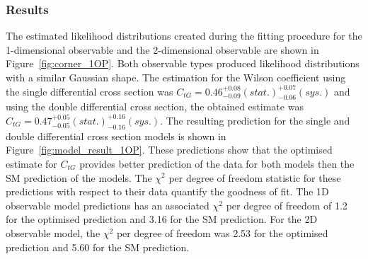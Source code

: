 \documentclass[a4paper,11pt]{article}
\begin{document}
\subsubsection{Results}
The estimated likelihood distributions created during the fitting procedure for the 1-dimensional observable and the 2-dimensional observable are shown in Figure~\ref{fig:corner_1OP}.
Both observable types produced likelihood distributions with a similar Gaussian shape.
The estimation for the Wilson coefficient using the single differential cross section was $C_{tG}=0.46^{+0.08}_{-0.09}(stat.)^{+0.07}_{-0.06}(sys.)$ and using the double differential cross section, the obtained estimate was $C_{tG}=0.47^{+0.05}_{-0.05}(stat.)^{+0.16}_{-0.16}(sys.)$.
The resulting prediction for the single and double differential cross section models is shown in Figure~\ref{fig:model_result_1OP}.
These predictions show that the optimised estimate for $C_{tG}$ provides better prediction of the data for both models then the SM prediction of the models.
The $\chi^{2}$ per degree of freedom statistic for these predictions with respect to their data quantify the goodness of fit.
The 1D observable model predictions has an associated $\chi^{2}$ per degree of freedom of 1.2 for the optimised prediction and 3.16 for the SM prediction.
For the 2D observable model, the $\chi^{2}$ per degree of freedom was 2.53 for the optimised prediction and 5.60 for the SM prediction.
\end{document}
